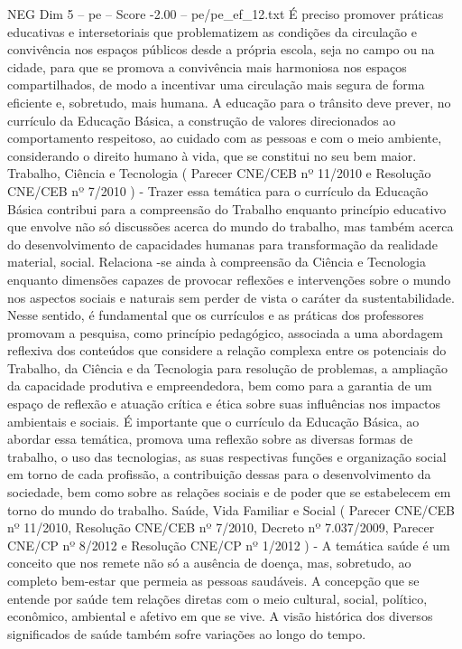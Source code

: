 \begin{textsample}{NEG Dim 5 – pe – Score -2.00 – pe/pe\_ef\_12.txt}
É preciso promover práticas educativas e intersetoriais que problematizem as condições da circulação e convivência nos espaços públicos desde a própria escola, seja no campo ou na cidade, para que se promova a convivência mais harmoniosa nos espaços compartilhados, de modo a incentivar uma circulação mais segura de forma eficiente e, sobretudo, mais humana.
A educação para o trânsito deve prever, no currículo da Educação Básica, a construção de valores direcionados ao comportamento respeitoso, ao cuidado com as pessoas e com o meio ambiente, considerando o direito humano à vida, que se constitui no seu bem maior.
Trabalho, Ciência e Tecnologia ( Parecer CNE/CEB nº 11/2010 e Resolução CNE/CEB nº 7/2010 ) - Trazer essa temática para o currículo da Educação Básica contribui para a compreensão do Trabalho enquanto princípio educativo que envolve não só discussões acerca do mundo do trabalho, mas também acerca do desenvolvimento de capacidades humanas para transformação da realidade material, social.
Relaciona -se ainda à compreensão da Ciência e Tecnologia enquanto dimensões capazes de provocar reflexões e intervenções sobre o mundo nos aspectos sociais e naturais sem perder de vista o caráter da sustentabilidade.
Nesse sentido, é fundamental que os currículos e as práticas dos professores promovam a pesquisa, como princípio pedagógico, associada a uma abordagem reflexiva dos conteúdos que considere a relação complexa entre os potenciais do Trabalho, da Ciência e da Tecnologia para resolução de problemas, a ampliação da capacidade produtiva e empreendedora, bem como para a garantia de um espaço de reflexão e atuação crítica e ética sobre suas influências nos impactos ambientais e sociais.
É importante que o currículo da Educação Básica, ao abordar essa temática, promova uma reflexão sobre as diversas formas de trabalho, o uso das tecnologias, as suas respectivas funções e organização social em torno de cada profissão, a contribuição dessas para o desenvolvimento da sociedade, bem como sobre as relações sociais e de poder que se estabelecem em torno do mundo do trabalho.
Saúde, Vida Familiar e Social ( Parecer CNE/CEB nº 11/2010, Resolução CNE/CEB nº 7/2010, Decreto nº 7.037/2009, Parecer CNE/CP nº 8/2012 e Resolução CNE/CP nº 1/2012 ) - A temática saúde é um conceito que nos remete não só a ausência de doença, mas, sobretudo, ao completo bem-estar que permeia as pessoas saudáveis.
A concepção que se entende por saúde tem relações diretas com o meio cultural, social, político, econômico, ambiental e afetivo em que se vive.
A visão histórica dos diversos significados de saúde também sofre variações ao longo do tempo.

\end{textsample}
